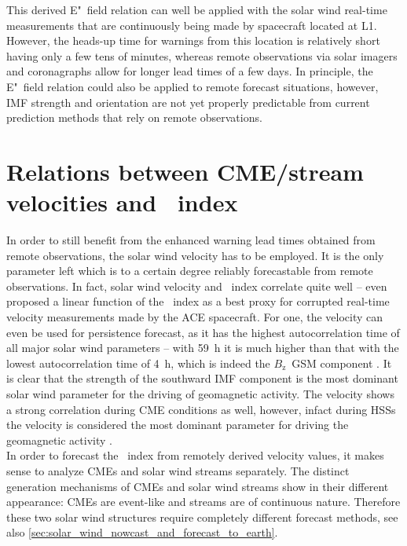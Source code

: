 This derived E"~field relation can well be applied with the solar wind real-time measurements that are continuously being made by spacecraft located at L1. However, the heads-up time for warnings from this location is relatively short having only a few tens of minutes, whereas remote observations via solar imagers and coronagraphs allow for longer lead times of a few days. In principle, the E"~field relation could also be applied to remote forecast situations, however, IMF strength and orientation are not yet properly predictable from current prediction methods that rely on remote observations.


\section{Relations between CME/stream velocities and \Kp~index}
\label{sec:relations_between_cme_stream_v_and_kp}
In order to still benefit from the enhanced warning lead times obtained from remote observations, the solar wind velocity has to be employed. It is the only parameter left which is to a certain degree reliably forecastable from remote observations. In fact, solar wind velocity and \Kp~index correlate quite well -- \citet{Machol2013} even proposed a linear function of the \Kp~index as a best proxy for corrupted real-time velocity measurements made by the ACE spacecraft. For one, the velocity can even be used for persistence forecast, as it has the highest autocorrelation time of all major solar wind parameters -- with \SI{59}{\hour} it is much higher than that with the lowest autocorrelation time of \SI{4}{\hour}, which is indeed the $B_\text{z}$~GSM component \citep{Elliott2013}.
It is clear that the strength of the southward IMF component is the most dominant solar wind parameter for the driving of geomagnetic activity. The velocity shows a strong correlation during CME conditions as well, however, infact during HSSs the velocity is considered the most dominant parameter for driving the geomagnetic activity \citep{Holappa2014}.\\

In order to forecast the \Kp~index from remotely derived velocity values, it makes sense to analyze CMEs and solar wind streams separately. The distinct generation mechanisms of CMEs and solar wind streams show in their different appearance: CMEs are event-like and streams are of continuous nature. Therefore these two solar wind structures require completely different forecast methods, see also \autoref{sec:solar_wind_nowcast_and_forecast_to_earth}.

